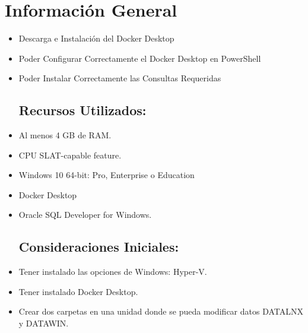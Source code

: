 \section{Información General}

	\begin{itemize}
		\subsection{Objetivos:}
			\item Descarga e Instalación del Docker Desktop
			\item Poder Configurar Correctamente el Docker Desktop en PowerShell
			\item Poder Instalar Correctamente las Consultas Requeridas
		\subsection{Recursos Utilizados:}
			\item Al menos 4 GB de RAM.
			\item CPU SLAT-capable feature.
			\item Windows 10 64-bit: Pro, Enterprise o Education
			\item Docker Desktop
			\item Oracle SQL Developer for Windows.
		\subsection{Consideraciones Iniciales:}
			\item Tener instalado las opciones de Windows: Hyper-V.
			\item Tener instalado Docker Desktop.
			\item Crear dos carpetas en una unidad donde se pueda modificar datos DATALNX y DATAWIN.
	\end{itemize}